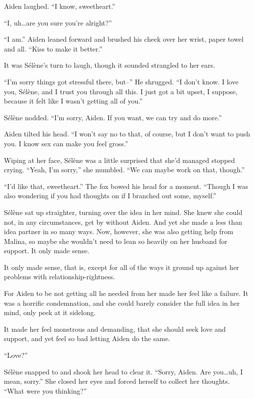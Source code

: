 Aiden laughed. ``I know, sweetheart.''

``I, uh\ldots{}are you sure you're alright?''

``I am.'' Aiden leaned forward and brushed his cheek over her wrist, paper towel and all. ``Kiss to make it better.''

It was Sélène's turn to laugh, though it sounded strangled to her ears.

``I'm sorry things got stressful there, but--'' He shrugged. ``I don't know. I love you, Sélène, and I trust you through all this. I just got a bit upset, I suppose, because it felt like I wasn't getting all of you.''

Sélène nodded. ``I'm sorry, Aiden. If you want, we can try and do more.''

Aiden tilted his head. ``I won't say no to that, of course, but I don't want to push you. I know sex can make you feel gross.''

Wiping at her face, Sélène was a little surprised that she'd managed stopped crying. ``Yeah, I'm sorry,'' she mumbled. ``We can maybe work on that, though.''

``I'd like that, sweetheart.'' The fox bowed his head for a moment. ``Though I was also wondering if you had thoughts on if I branched out some, myself.''

Sélène sat up straighter, turning over the idea in her mind. She knew she could not, in any circumstances, get by without Aiden. And yet she made a less than idea partner in so many ways. Now, however, she was also getting help from Malina, so maybe she wouldn't need to lean so heavily on her husband for support. It only made sense.

It only made sense, that is, except for all of the ways it ground up against her problems with relationship-rightness.

For Aiden to be not getting all he needed from her made her feel like a failure. It was a horrific condemnation, and she could barely consider the full idea in her mind, only peek at it sidelong.

It made her feel monstrous and demanding, that she should seek love and support, and yet feel so bad letting Aiden do the same.

``Love?''

Sélène snapped to and shook her head to clear it. ``Sorry, Aiden. Are you\ldots{}uh, I mean, sorry.'' She closed her eyes and forced herself to collect her thoughts. ``What were you thinking?''

